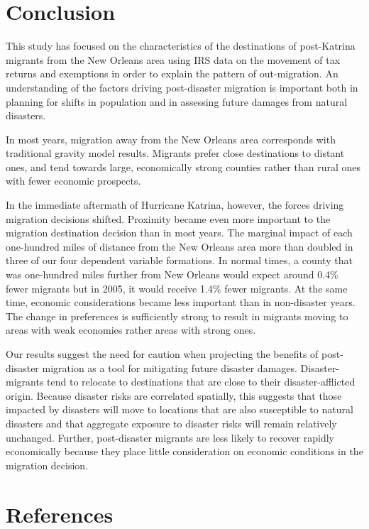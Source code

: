 \documentclass[]{article}
\begin{document}
\section{\texorpdfstring{Conclusion
\label{sec:conclusion}}{Conclusion }}\label{conclusion}

This study has focused on the characteristics of the destinations of
post-Katrina migrants from the New Orleans area using IRS data on the
movement of tax returns and exemptions in order to explain the pattern
of out-migration. An understanding of the factors driving post-disaster
migration is important both in planning for shifts in population and in
assessing future damages from natural disasters.

In most years, migration away from the New Orleans area corresponds with
traditional gravity model results. Migrants prefer close destinations to
distant ones, and tend towards large, economically strong counties
rather than rural ones with fewer economic prospects.

In the immediate aftermath of Hurricane Katrina, however, the forces
driving migration decisions shifted. Proximity became even more
important to the migration destination decision than in most years. The
marginal impact of each one-hundred miles of distance from the New
Orleans area more than doubled in three of our four dependent variable
formations. In normal times, a county that was one-hundred miles further
from New Orleans would expect around 0.4\% fewer migrants but in 2005,
it would receive 1.4\% fewer migrants. At the same time, economic
considerations became less important than in non-disaster years. The
change in preferences is sufficiently strong to result in migrants
moving to areas with weak economies rather areas with strong ones.

Our results suggest the need for caution when projecting the benefits of
post-disaster migration as a tool for mitigating future disaster
damages. Disaster-migrants tend to relocate to destinations that are
close to their disaster-afflicted origin. Because disaster risks are
correlated spatially, this suggests that those impacted by disasters
will move to locations that are also susceptible to natural disasters
and that aggregate exposure to disaster risks will remain relatively
unchanged. Further, post-disaster migrants are less likely to recover
rapidly economically because they place little consideration on economic
conditions in the migration decision.

\newpage

\section{References}\label{references}
\end{document}
